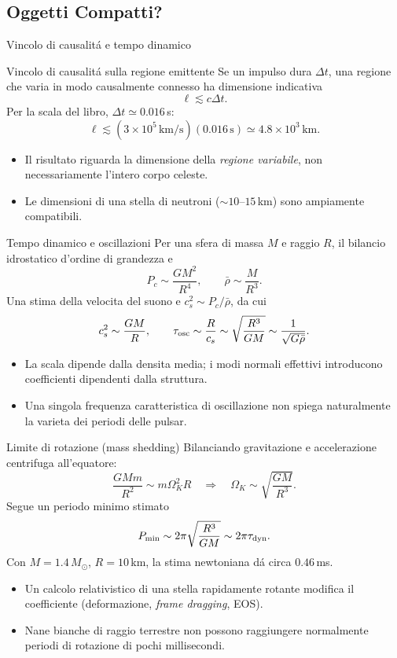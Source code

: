 \subsection{Oggetti Compatti?}


\begin{frame}[t]{Vincolo di causalit\'a e tempo dinamico}
\begin{block}[t]{Vincolo di causalit\'a sulla regione emittente}
\small
Se un impulso dura $\Delta t$, una regione che varia in modo causalmente connesso ha dimensione indicativa
\[
\ell\lesssim c\Delta t.
\]
Per la scala del libro, $\Delta t\simeq0.016\,$s:
\[
\ell\lesssim(3\times10^5\,\mathrm{km/s})(0.016\,\mathrm s)
\simeq4.8\times10^3\,\mathrm{km}.
\]
\begin{itemize}
\item Il risultato riguarda la dimensione della \emph{regione variabile}, non necessariamente l'intero corpo celeste.
\item Le dimensioni di una stella di neutroni ($\sim10$--$15\,$km) sono ampiamente compatibili.
\end{itemize}
\end{block}
\begin{block}[t]{Tempo dinamico e oscillazioni}
\small
Per una sfera di massa $M$ e raggio $R$, il bilancio idrostatico d'ordine di grandezza e
\[
P_c\sim\frac{GM^2}{R^4},\qquad \bar\rho\sim\frac{M}{R^3}.
\]
Una stima della velocita del suono e $c_s^2\sim P_c/\bar\rho$, da cui
\[
c_s^2\sim\frac{GM}{R},\qquad
\tau_{\rm osc}\sim\frac R{c_s}
\sim\sqrt{\frac{R^3}{GM}}
\sim\frac1{\sqrt{G\bar\rho}}.
\]
\begin{itemize}
\item La scala dipende dalla densita media; i modi normali effettivi introducono coefficienti dipendenti dalla struttura.
\item Una singola frequenza caratteristica di oscillazione non spiega naturalmente la varieta dei periodi delle pulsar.
\end{itemize}
\end{block}
\end{frame}

\begin{frame}[t]{Limite di rotazione (mass shedding)}
\small
Bilanciando gravitazione e accelerazione centrifuga all'equatore:
\[
\frac{GMm}{R^2}\sim m\Omega_K^2R
\quad\Longrightarrow\quad
\Omega_K\sim\sqrt{\frac{GM}{R^3}}.
\]
Segue un periodo minimo stimato
\[
P_{\min}\sim2\pi\sqrt{\frac{R^3}{GM}}\sim2\pi\tau_{\rm dyn}.
\]
Con $M=1.4\,M_\odot$, $R=10\,$km, la stima newtoniana d\'a circa $0.46\,$ms.
\begin{itemize}
\item Un calcolo relativistico di una stella rapidamente rotante modifica il coefficiente (deformazione, \emph{frame dragging}, EOS).
\item Nane bianche di raggio terrestre non possono raggiungere normalmente periodi di rotazione di pochi millisecondi.
\end{itemize}
\end{frame}

